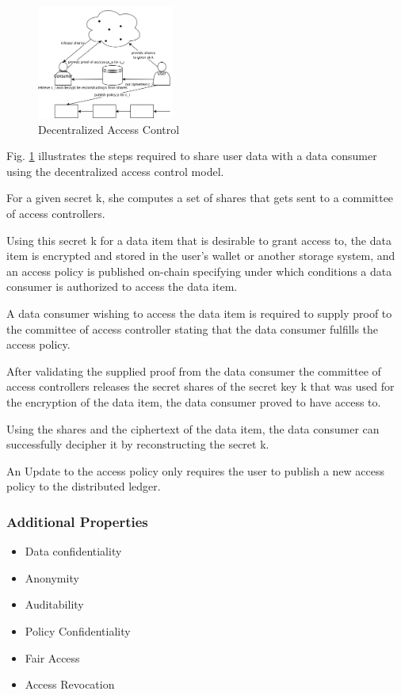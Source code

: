 \documentclass[conference]{IEEEtran}
\begin{document}
\begin{figure}[htbp]
  \centering
  \includegraphics[width=0.4\textwidth]{figures/decentralized_access_control.png}
  \caption{Decentralized Access Control}
  \label{fig:decentralized_access_control}
\end{figure}
Fig. \ref{fig:decentralized_access_control} illustrates the steps required to share user data with a data consumer using the decentralized access control model.

For a given secret k, she computes a set of shares that gets sent to a committee of access controllers.

Using this secret k for a data item that is desirable to grant access to, the data item is encrypted and stored in the user's wallet or another storage system, and an access policy is published on-chain specifying under which conditions a data consumer is authorized to access the data item.

A data consumer wishing to access the data item is required to supply proof to the committee of access controller stating that the data consumer fulfills the access policy.

After validating the supplied proof from the data consumer the committee of access controllers releases the secret shares of the secret key k that was used for the encryption of the data item, the data consumer proved to have access to.

Using the shares and the ciphertext of the data item, the data consumer can successfully decipher it by reconstructing the secret k.

An Update to the access policy only requires the user to publish a new access policy to the distributed ledger.

\subsubsection{Additional Properties}
\begin{itemize}
  \item Data confidentiality
  \item Anonymity
  \item Auditability
  \item Policy Confidentiality
  \item Fair Access
  \item Access Revocation
\end{itemize}
\end{document}
